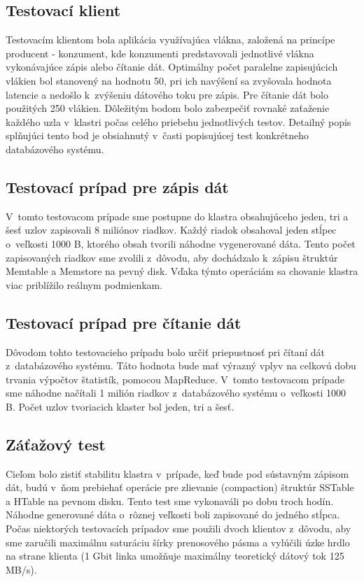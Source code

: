 \documentclass[11pt,twoside,a4paper]{book}
\begin{document}
\subsection{Testovací klient}

Testovacím klientom bola aplikácia využívajúca vlákna, založená na princípe producent - konzument, kde konzumenti predstavovali jednotlivé vlákna vykonávajúce zápis alebo čítanie dát. Optimálny počet paralelne zapisujúcich vlákien bol stanovený na hodnotu 50, pri ich navýšení sa zvyšovala hodnota latencie a nedošlo k~zvýšeniu dátového toku pre zápis. Pre čítanie dát bolo použitých 250 vlákien. Dôležitým bodom bolo zabezpečiť rovnaké zaťaženie každého uzla v~klastri počas celého priebehu jednotlivých testov. Detailný popis splňujúci tento bod je obsiahnutý v~časti popisujúcej test konkrétneho databázového systému.

\subsection{Testovací prípad pre zápis dát}

V~tomto testovacom prípade sme postupne do klastra obsahujúceho jeden, tri a šesť uzlov zapisovali 8 miliónov riadkov. Každý riadok obsahoval jeden stĺpec o~veľkosti 1000 B, ktorého obsah tvorili náhodne vygenerované dáta. Tento počet zapisovaných riadkov sme zvolili z~dôvodu, aby dochádzalo k~zápisu štruktúr Memtable a Memstore na pevný disk. Vďaka týmto operáciám sa chovanie klastra viac priblížilo reálnym podmienkam.

\subsection{Testovací prípad pre čítanie dát}

Dôvodom tohto testovacieho prípadu bolo určiť priepustnosť pri čítaní dát z~databázového systému. Táto hodnota bude mať výrazný vplyv na celkovú dobu trvania výpočtov štatistík, pomocou MapReduce. V~tomto testovacom prípade sme náhodne načítali 1 milión riadkov z~databázového systému o~veľkosti 1000 B. Počet uzlov tvoriacich klaster bol jeden, tri a šesť.

\subsection{Záťažový test}

Cieľom bolo zistiť stabilitu klastra v~prípade, keď bude pod sústavným zápisom dát, budú v~ňom prebiehať  operácie pre zlievanie (compaction) štruktúr SSTable a HTable na pevnom disku. Tento test sme vykonaváli po dobu troch hodín. Náhodne generované dáta o~rôznej veľkosti boli zapisované do jedného stĺpca. Počas niektorých testovacích prípadov sme použili dvoch klientov z~dôvodu, aby sme zaručili maximálnu saturáciu šírky prenosového pásma a vylúčili úzke hrdlo na strane klienta (1 Gbit linka umožňuje maximálny teoretický dátový tok 125 MB/s).
\end{document}
